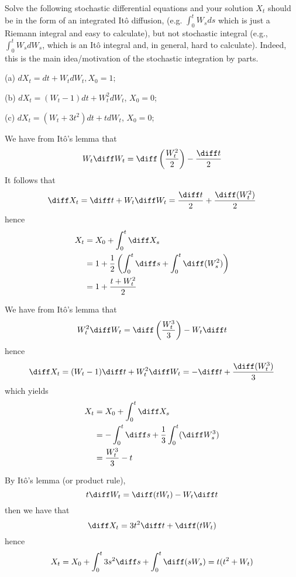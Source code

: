     \problem
    \begin{question}
        Solve the following stochastic differential equations and your solution $X_t$ should be in the form of an integrated It\^o diffusion, (e.g. $\int_0^t W_sds$ which is just a Riemann integral and easy to calculate), but not stochastic integral (e.g., $\int_0^t W_sdW_s$, which is an It\^o integral and, in general, hard to calculate).  Indeed, this is the main idea/motivation of the stochastic integration by parts.

        (a)  $dX_t=dt+W_tdW_t, X_0=1$;

        (b) $dX_t=(W_t-1)dt+W_t^2dW_t$, $X_0=0$;

        (c)  $dX_t=(W_t+3t^2)dt+tdW_t$, $X_0=0$;
    \end{question}
    \begin{subproblem}[(\alph*)]
        \item
        We have from It\^o's lemma that
        \[W_t\diff W_t=\diff\left(\frac{W_t^2}{2}\right)-\frac{\diff t}{2}\]
        It follows that
        \[\diff X_t=\diff t+W_t\diff W_t=\frac{\diff t}{2}+\frac{\diff (W_t^2)}{2}\]
        hence
        \[\begin{aligned}
            X_t&=X_0+\int_0^t\diff X_s\\
            &=1+\frac{1}{2}\left(\int_0^t\diff s+\int_0^t\diff(W_s^2)\right)\\
            &=1+\frac{t+W_t^2}{2}
        \end{aligned}\]

        \item
        We have from It\^o's lemma that
        \[W_t^2\diff W_t=\diff\left(\frac{W_t^3}{3}\right)-W_t\diff t\]
        hence
        \[\diff X_t=(W_t-1)\diff t+W_t^2\diff W_t=-\diff t+\frac{\diff(W_t^3)}{3}\]
        which yields
        \[\begin{aligned}
            X_t&=X_0+\int_0^t\diff X_s\\
            &=-\int_0^t\diff s+\frac{1}{3}\int_0^t(\diff W_s^3)\\
            &=\frac{W_t^3}{3}-t
        \end{aligned}\]

        \item
        By It\^o's lemma (or product rule),
        \[t\diff W_t=\diff(tW_t)-W_t\diff t\]
        then we have that
        \[\diff X_t=3t^2\diff t+\diff(tW_t)\]
        hence
        \[X_t=X_0+\int_0^t3s^2\diff s+\int_0^t\diff (sW_s)=t(t^2+W_t)\]
    \end{subproblem}


